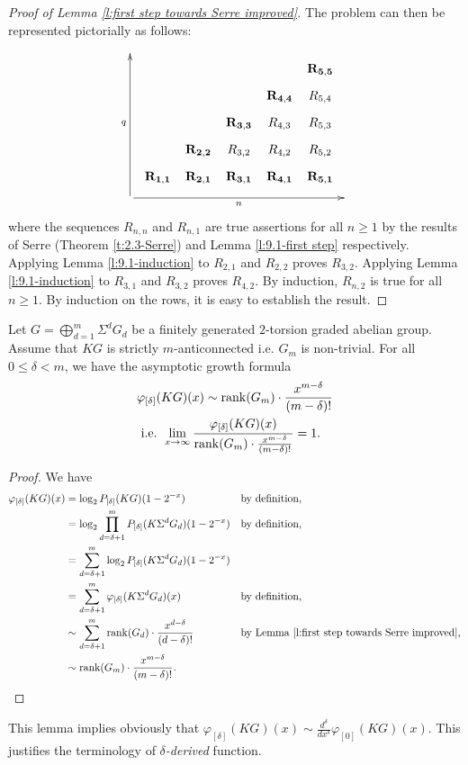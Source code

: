 \begin{proof}[Proof of Lemma \ref{l:first step towards Serre improved}]
The problem can then be represented pictorially as follows:
$$
\xymatrix@R=0.2cm@C=0.2cm{
\\
&&&&&{\bf R_{5,5}}\\
&&&&{\bf R_{4,4}} &R_{5,4}\\
&&&{\bf R_{3,3}} &R_{4,3} &R_{5,3}\\
&&{\bf R_{2,2}} &R_{3,2} &R_{4,2} &R_{5,2}\\
&{\bf R_{1,1}} &{\bf R_{2,1}} &{\bf R_{3,1}} &{\bf R_{4,1}} &{\bf R_{5,1}}\\
\ar[uuuuuu]^q
\ar[rrrrrr]_-n &&&&&&
}
$$
where the sequences $R_{n,n}$ and $R_{n,1}$ are true assertions for all $n\geq1$ by the results of Serre (Theorem \ref{t:2.3-Serre}) and Lemma \ref{l:9.1-first step} respectively. Applying Lemma \ref{l:9.1-induction} to $R_{2,1}$ and $R_{2,2}$ proves $R_{3,2}$. Applying Lemma \ref{l:9.1-induction} to $R_{3,1}$ and $R_{3,2}$ proves $R_{4,2}$. By induction, $R_{n,2}$ is true for all $n\geq1$. By induction on the rows, it is easy to establish the result.
\end{proof}

\begin{lem}\label{l:Serre improved}
Let $G=\bigoplus_{d=1}^m\Sigma^d G_d$ be a finitely generated $2$-torsion graded abelian group. Assume that $KG$ is strictly $m$-anticonnected i.e. $G_m$ is non-trivial. For all $0\leq\delta<m$, we have the asymptotic growth formula
\begin{align*}
&\varphi_{[\delta]}(KG)(x)\sim \operatorname{rank}(G_m)\cdot\frac{x^{m-\delta}}{(m-\delta)!}\\ 
&\text{ i.e. }\lim_{x\to\infty}\frac{\varphi_{[\delta]}(KG)(x)}{\operatorname{rank}(G_m)\cdot\frac{x^{m-\delta}}{(m-\delta)!}}=1.
\end{align*}
\end{lem}

\begin{proof} %
We have
\begin{align*}
\varphi_{[\delta]}(KG)(x) &=\log_2 P_{[\delta]}(KG)(1-2^{-x}) &&\text{by definition,}\\
&=\log_2\prod_{d=\delta+1}^m P_{[\delta]}(K\Sigma^d G_d)(1-2^{-x}) &&\text{by definition,}\\
&=\sum_{d=\delta+1}^m\log_2 P_{[\delta]}(K\Sigma^d G_d)(1-2^{-x})\\
&=\sum_{d=\delta+1}^m\varphi_{[\delta]}(K\Sigma^d G_d)(x) &&\text{by definition,}\\
&\sim\sum_{d=\delta+1}^m\operatorname{rank}(G_d)\cdot\frac{x^{d-\delta}}{(d-\delta)!} &&\text{by Lemma \ref{l:first step towards Serre improved},}\\
&\sim\operatorname{rank}(G_m)\cdot\frac{x^{m-\delta}}{(m-\delta)!}.
\end{align*}
\end{proof}

\begin{rem*}
This lemma implies obviously that $\varphi_{[\delta]}(KG)(x)\sim\frac{d^\delta}{d x^\delta}\varphi_{[0]}(KG)(x)$. This justifies the terminology of {\it $\delta$-derived} function.
\end{rem*}

\endinput